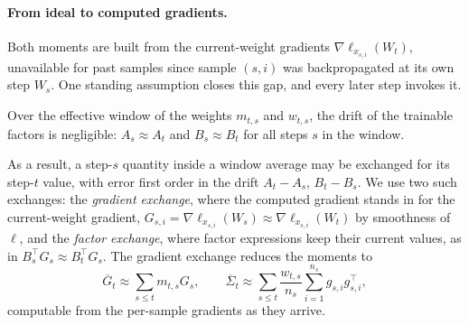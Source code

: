 \paragraph{From ideal to computed gradients.} Both moments are built from
the current-weight gradients $\nabla\ell_{x_{s,i}}(W_t)$, unavailable for
past samples since sample $(s,i)$ was backpropagated at its own step
$W_s$. One standing assumption closes this gap, and every later step
invokes it.
\begin{assumption}\label{as:slow-drift}
Over the effective window of the weights $m_{t,s}$ and $w_{t,s}$, the
drift of the trainable factors is negligible: $A_s\approx A_t$ and
$B_s\approx B_t$ for all steps $s$ in the window.
\end{assumption}
\noindent As a result, a step-$s$ quantity inside a window average may
be exchanged for its step-$t$ value, with error first order in the
drift $A_t-A_s$, $B_t-B_s$. We use two such exchanges: the
\emph{gradient exchange}, where the computed gradient stands in for
the current-weight gradient,
$G_{s,i}=\nabla\ell_{x_{s,i}}(W_s)\approx\nabla\ell_{x_{s,i}}(W_t)$ by
smoothness of $\ell$, and the \emph{factor exchange}, where factor
expressions keep their current values, as in
$B_s^\top G_s\approx B_t^\top G_s$. The gradient exchange reduces the
moments to
\[
\overline G_t\approx\sum_{s\le t}m_{t,s}G_s,
\qquad
\overline\Sigma_t \approx \sum_{s\le t}\frac{w_{t,s}}{n_s}\sum_{i=1}^{n_s}g_{s,i}g_{s,i}^\top,
\]
computable from the per-sample gradients as they arrive.



